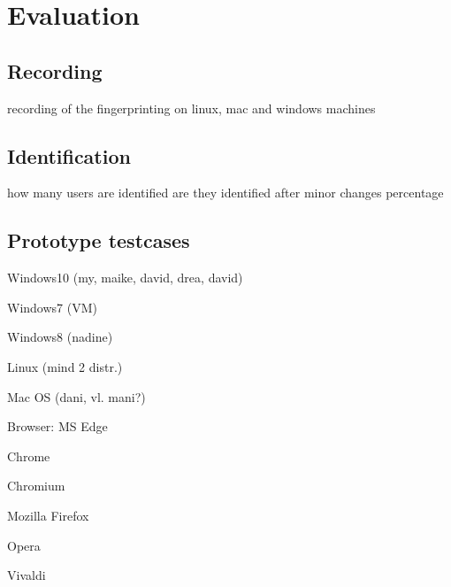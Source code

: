 \chapter{Evaluation}
\label{cha:evaluation}


\section{Recording}
recording of the fingerprinting
on linux, mac and windows machines

\section{Identification}
how many users are identified
are they identified after minor changes
percentage

\section{Prototype testcases}

Windows10 (my, maike, david, drea, david)

Windows7 (VM)

Windows8 (nadine)

Linux (mind 2 distr.)

Mac OS (dani, vl. mani?)

Browser:
MS Edge

Chrome

Chromium

Mozilla Firefox

Opera

Vivaldi